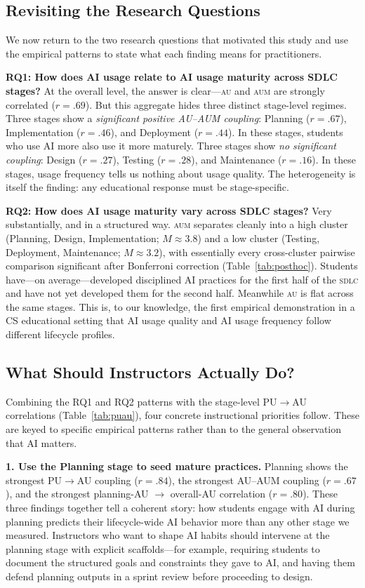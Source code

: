 \documentclass[sigconf,anonymous]{acmart}
\newcommand{\AUM}{\textsc{aum}\xspace}
\newcommand{\AU}{\textsc{au}\xspace}
\newcommand{\SDLC}{\textsc{sdlc}\xspace}
\begin{document}
\subsection{Revisiting the Research Questions}
We now return to the two research questions that motivated this study
and use the empirical patterns to state what each finding means for
practitioners.

\textbf{RQ1: How does AI usage relate to AI usage maturity across SDLC
stages?} At the overall level, the answer is clear---\AU and \AUM are
strongly correlated ($r = .69$). But this aggregate hides three
distinct stage-level regimes. Three stages show a \emph{significant
positive AU--AUM coupling}: Planning ($r = .67$), Implementation
($r = .46$), and Deployment ($r = .44$). In these stages, students who
use AI more also use it more maturely. Three stages show \emph{no
significant coupling}: Design ($r = .27$), Testing ($r = .28$), and
Maintenance ($r = .16$). In these stages, usage frequency tells us
nothing about usage quality. The heterogeneity is itself the finding:
any educational response must be stage-specific.

\textbf{RQ2: How does AI usage maturity vary across SDLC stages?}
Very substantially, and in a structured way. \AUM separates cleanly
into a high cluster (Planning, Design, Implementation; $M \approx 3.8$)
and a low cluster (Testing, Deployment, Maintenance;
$M \approx 3.2$), with essentially every cross-cluster pairwise
comparison significant after Bonferroni correction
(Table~\ref{tab:posthoc}). Students have---on average---developed
disciplined AI practices for the first half of the \SDLC and have not
yet developed them for the second half. Meanwhile \AU is flat across
the same stages. This is, to our knowledge, the first empirical
demonstration in a CS educational setting that AI usage quality and
AI usage frequency follow different lifecycle profiles.

\subsection{What Should Instructors Actually Do?}
Combining the RQ1 and RQ2 patterns with the stage-level PU$\rightarrow$AU
correlations (Table~\ref{tab:puau}), four concrete instructional
priorities follow. These are keyed to specific empirical patterns
rather than to the general observation that AI matters.

\textbf{1. Use the Planning stage to seed mature practices.} Planning
shows the strongest PU$\rightarrow$AU coupling ($r = .84$), the
strongest AU--AUM coupling ($r = .67$), and the strongest planning-AU
$\rightarrow$ overall-AU correlation ($r = .80$). These three
findings together tell a coherent story: how students engage with AI
during planning predicts their lifecycle-wide AI behavior more than
any other stage we measured. Instructors who want to shape AI habits
should intervene at the planning stage with explicit scaffolds---for
example, requiring students to document the structured goals and
constraints they gave to AI, and having them defend planning outputs
in a sprint review before proceeding to design.
\end{document}
